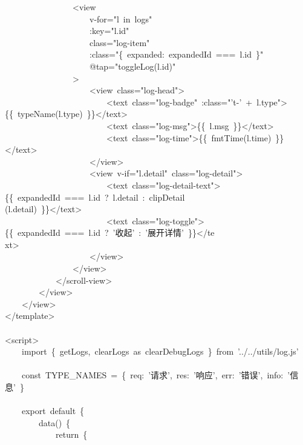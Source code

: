 \documentclass[a4paper,10pt]{article}
\begin{document}
{\ttfamily\footnotesize\raggedright
~~~~~~~~~~~~~~~~<view\\
~~~~~~~~~~~~~~~~~~~~v-for="l~in~logs"\\
~~~~~~~~~~~~~~~~~~~~:key="l.id"\\
~~~~~~~~~~~~~~~~~~~~class="log-item"\\
~~~~~~~~~~~~~~~~~~~~:class="\{~expanded:~expandedId~===~l.id~\}"\\
~~~~~~~~~~~~~~~~~~~~@tap="toggleLog(l.id)"\\
~~~~~~~~~~~~~~~~>\\
~~~~~~~~~~~~~~~~~~~~<view~class="log-head">\\
~~~~~~~~~~~~~~~~~~~~~~~~<text~class="log-badge"~:class="'t-'~+~l.type">\{\{~typeName(l.type)~\}\}</text>\\
~~~~~~~~~~~~~~~~~~~~~~~~<text~class="log-msg">\{\{~l.msg~\}\}</text>\\
~~~~~~~~~~~~~~~~~~~~~~~~<text~class="log-time">\{\{~fmtTime(l.time)~\}\}</text>\\
~~~~~~~~~~~~~~~~~~~~</view>\\
~~~~~~~~~~~~~~~~~~~~<view~v-if="l.detail"~class="log-detail">\\
~~~~~~~~~~~~~~~~~~~~~~~~<text~class="log-detail-text">\{\{~expandedId~===~l.id~?~l.detail~:~clipDetail\\
(l.detail)~\}\}</text>\\
~~~~~~~~~~~~~~~~~~~~~~~~<text~class="log-toggle">\{\{~expandedId~===~l.id~?~'收起'~:~'展开详情'~\}\}</te\\
xt>\\
~~~~~~~~~~~~~~~~~~~~</view>\\
~~~~~~~~~~~~~~~~</view>\\
~~~~~~~~~~~~</scroll-view>\\
~~~~~~~~</view>\\
~~~~</view>\\
</template>\\
\mbox{}\\
<script>\\
~~~~import~\{~getLogs,~clearLogs~as~clearDebugLogs~\}~from~'../../utils/log.js'\\
\mbox{}\\
~~~~const~TYPE\_NAMES~=~\{~req:~'请求',~res:~'响应',~err:~'错误',~info:~'信息'~\}\\
\mbox{}\\
~~~~export~default~\{\\
~~~~~~~~data()~\{\\
~~~~~~~~~~~~return~\{\\
}
\end{document}
